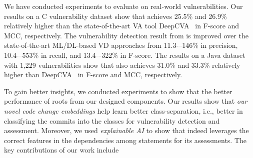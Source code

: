 

We have conducted experiments to evaluate {\tool} on real-world
vulnerabilities. Our results on a C vulnerability dataset show that
{\tool} achieves 25.5\% and 26.9\% relatively higher than the
state-of-the-art VA tool DeepCVA~\cite{deepCVA-ase21} in F-score and
MCC, respectively. The vulnerability detection result from {\tool} is
improved over the state-of-the-art ML/DL-based VD approaches from
11.3-–146\% in precision, 10.4-–553\% in recall, and 13.4–-322\% in
F-score.
The results on a Java dataset with 1,229 vulnerabilities show that
{\tool} also achieves 31.0\% and 33.3\% relatively higher
than DeepCVA~\cite{deepCVA-ase21} in F-score and MCC, respectively.


To gain better insights, we conducted experiments to show that the better
performance of {\tool} roots from our designed components.
Our results show that {\em our novel code change embeddings} help
{\tool} learn better class-separation, i.e., better in classifying the
commits into the classes for vulnerability detection and
assessment. Moreover, we used {\em explainable AI} to show
that {\tool} indeed leverages the correct features in the
  dependencies among statements for its assessments.
The key contributions of our work include

